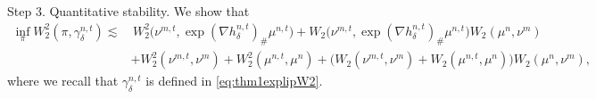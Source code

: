 \documentclass[11pt,a4paper,oneside]{amsart}
\numberwithin{equation}{section}
\begin{document}
%
\medskip
%

{\sc Step 3. Quantitative stability. }We show that 
%
\begin{equation}\label{QuantitativeEstiPlan}
%
\begin{aligned}
%
\inf_\pi W^2_2(\pi,\gamma^{n,t}_\delta)\lesssim&\, W^2_2\big(\nu^{m,t},\exp(\nabla h^{n,t}_\delta)_\#\mu^{n,t}\big)+W_2\big(\nu^{m,t},\exp(\nabla h^{n,t}_\delta)_\#\mu^{n,t}\big)W_2(\mu^{n},\nu^{m})\\
&+W^2_2(\nu^{m,t},\nu^{m})+W^2_2(\mu^{n,t},\mu^{n})+\big(W_2(\nu^{m,t},\nu^m)+W_2(\mu^{n,t},\mu^n)\big)W_2(\mu^n,\nu^m),
%
\end{aligned}
\end{equation}
%
where we recall that $\gamma^{n,t}_\delta$ is defined in \eqref{eq:thm1explipW2}.

%
\medskip
%
\end{document}
